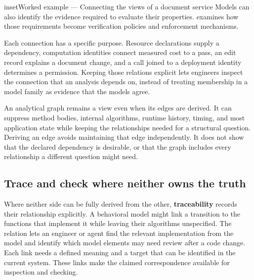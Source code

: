 \begin{bookbox}{inset}{Worked example --- Connecting the views of a document service}
Models can also identify the evidence required to evaluate their properties.  examines how those requirements become verification policies and enforcement mechanisms.

Each connection has a specific purpose. Resource declarations supply a dependency, computation identities connect measured cost to a pass, an edit record explains a document change, and a call joined to a deployment identity determines a permission. Keeping those relations explicit lets engineers inspect the connection that an analysis depends on, instead of treating membership in a model family as evidence that the models agree.
\end{bookbox}


An analytical graph remains a view even when its edges are derived. It can suppress method bodies, internal algorithms, runtime history, timing, and most application state while keeping the relationships needed for a structural question. Deriving an edge avoids maintaining that edge independently. It does not show that the declared dependency is desirable, or that the graph includes every relationship a different question might need.



\subsection{Trace and check where neither owns the truth}\label{heading:trace-and-check-where-neither-owns-the-truth}

Where neither side can be fully derived from the other, \textbf{traceability} records their relationship explicitly. A behavioral model might link a transition to the functions that implement it while leaving their algorithms unspecified. The relation lets an engineer or agent find the relevant implementation from the model and identify which model elements may need review after a code change. Each link needs a defined meaning and a target that can be identified in the current system. These links make the claimed correspondence available for inspection and checking.

